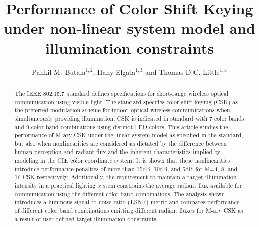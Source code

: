 \documentclass[10pt,letterpaper]{article}
\begin{document}
\title{Performance of Color Shift Keying under non-linear system model and illumination constraints}

\author{Pankil M. Butala$^{1,2}$, Hany Elgala$^{1,3}$ and Thomas D.C. Little$^{1,4}$}

\address{$^{1}$Multimedia Communication Laboratory and Smart Lighting Engineering Research Center\\
Boston University, Boston, MA 02215, USA\\
\{$^2$pbutala,$^3$helgala,$^4$tdcl\}@bu.edu}



\begin{abstract}
The IEEE 802.15.7 standard defines specifications for short-range wireless optical communication using visible light. The standard specifies color shift keying (CSK) as the preferred modulation scheme for indoor optical wireless communications when simultaneously providing illumination. CSK is indicated in standard with 7 color bands and 9 color band combinations using distinct LED colors. This article studies the performance of M-ary CSK under the linear system model as specified in the standard, but also when nonlinearities are considered as dictated by the difference between human perception and radiant flux and the inherent characteristics implied by modeling in the CIE color coordinate system. It is shown that these nonlinearities introduce performance penalties of more than 15dB, 10dB, and 5dB for M=4, 8, and 16-CSK respectively. Additionally, the requirement to maintain a target illumination intensity in a practical lighting system constrains the average radiant flux available for communication using the different color band combinations. The analysis shown introduces a luminous-signal-to-noise ratio (LSNR) metric and compares performance of different color band combinations emitting different radiant fluxes for M-ary CSK as a result of user defined target illumination constraints.
\end{abstract}

\end{document}
